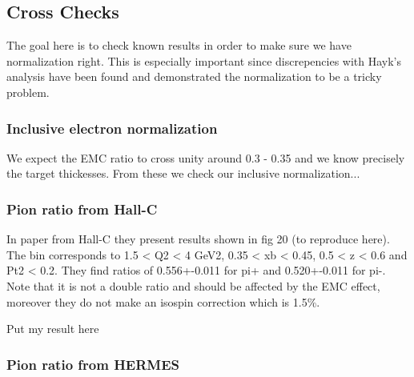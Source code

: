 \subsection{Cross Checks}
\label{sec:XChecks}

The goal here is to check known results in order to make sure we have normalization right. This is 
especially important since discrepencies with Hayk's analysis have been found and demonstrated the 
normalization to be a tricky problem.

\subsubsection{Inclusive electron normalization}

We expect the EMC ratio to cross unity around 0.3 - 0.35 and we know precisely the target thickesses.
From these we check our inclusive normalization...

\subsubsection{Pion ratio from Hall-C}

In paper from Hall-C they present results shown in fig 20 (to reproduce here). The bin corresponds to 
1.5 < Q2 < 4 GeV2, 0.35 < xb < 0.45, 0.5 < z < 0.6 and Pt2 < 0.2. They find ratios of 0.556+-0.011 for pi+
and 0.520+-0.011 for pi-. Note that it is not a double ratio and should be affected by the EMC effect,
moreover they do not make an isospin correction which is 1.5\%.

Put my result here

\subsubsection{Pion ratio from HERMES}
